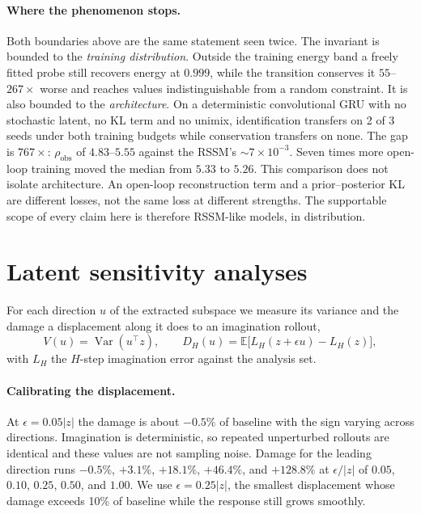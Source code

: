 \paragraph{Where the phenomenon stops.}
Both boundaries above are the same statement seen twice. The invariant is bounded to the
\emph{training distribution}. Outside the training energy band a freely fitted probe still recovers
energy at $0.999$, while the transition conserves it $55$--$267\times$ worse and reaches values
indistinguishable from a random constraint. It is also bounded to the \emph{architecture}. On a
deterministic convolutional GRU with no stochastic latent, no KL term and no unimix, identification
transfers on 2 of 3 seeds under both training budgets while conservation transfers on none. The gap
is $767\times$: $\rho_{\mathrm{obs}}$ of $4.83$--$5.55$ against the RSSM's ${\sim}7\times10^{-3}$.
Seven times more open-loop training moved the median from $5.33$ to $5.26$. This comparison does not
isolate architecture. An open-loop reconstruction term and a prior--posterior KL are different
losses, not the same loss at different strengths. The supportable scope of every claim here is
therefore RSSM-like models, in distribution.

\section{Latent sensitivity analyses}
\label{sec:sensitivity}

For each direction $u$ of the extracted subspace we measure its variance and the damage a
displacement along it does to an imagination rollout,
\begin{equation}
V(u) = \operatorname{Var}(u^\top z), \qquad
D_H(u) = \mathbb{E}\bigl[L_H(z+\epsilon u) - L_H(z)\bigr],
\label{eq:leverage}
\end{equation}
with $L_H$ the $H$-step imagination error against the analysis set.

\paragraph{Calibrating the displacement.} At $\epsilon = 0.05|z|$ the damage is about $-0.5\%$ of
baseline with the sign varying across directions. Imagination is deterministic, so repeated
unperturbed rollouts are identical and these values are not sampling noise. Damage for the leading
direction runs $-0.5\%$, $+3.1\%$, $+18.1\%$, $+46.4\%$, and $+128.8\%$ at $\epsilon/|z|$ of $0.05$,
$0.10$, $0.25$, $0.50$, and $1.00$. We use $\epsilon = 0.25|z|$, the smallest displacement whose
damage exceeds 10\% of baseline while the response still grows smoothly.

